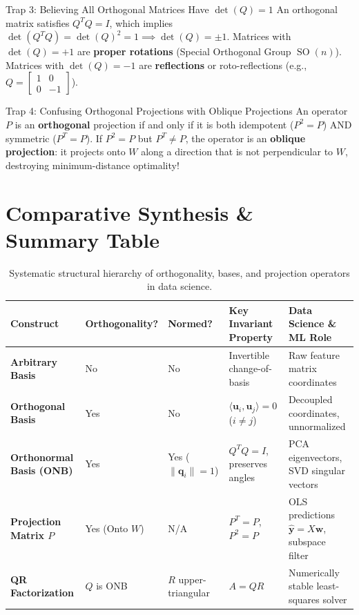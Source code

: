 \begin{trapbox}{Trap 3: Believing All Orthogonal Matrices Have $\det(Q) = 1$}
An orthogonal matrix satisfies $Q^T Q = I$, which implies $\det(Q^T Q) = \det(Q)^2 = 1 \implies \det(Q) = \pm 1$. Matrices with $\det(Q) = +1$ are \textbf{proper rotations} (Special Orthogonal Group $\operatorname{SO}(n)$). Matrices with $\det(Q) = -1$ are \textbf{reflections} or roto-reflections (e.g., $Q = \begin{bmatrix} 1 & 0 \\ 0 & -1 \end{bmatrix}$).
\end{trapbox}

\begin{trapbox}{Trap 4: Confusing Orthogonal Projections with Oblique Projections}
An operator $P$ is an \textbf{orthogonal} projection if and only if it is both idempotent ($P^2 = P$) AND symmetric ($P^T = P$). If $P^2 = P$ but $P^T \neq P$, the operator is an \textbf{oblique projection}: it projects onto $W$ along a direction that is not perpendicular to $W$, destroying minimum-distance optimality!
\end{trapbox}

\section{Comparative Synthesis \& Summary Table}

\begin{table}[htbp]
\centering
\small
\begin{tabular}{p{2.8cm} p{2.2cm} p{2.5cm} p{2.8cm} p{3.2cm}}
\toprule
\textbf{Construct} & \textbf{Orthogonality?} & \textbf{Normed?} & \textbf{Key Invariant Property} & \textbf{Data Science \& ML Role} \\
\midrule
\textbf{Arbitrary Basis} & No & No & Invertible change-of-basis & Raw feature matrix coordinates \\
\textbf{Orthogonal Basis} & Yes & No & $\langle \mathbf{u}_i, \mathbf{u}_j \rangle = 0$ ($i \neq j$) & Decoupled coordinates, unnormalized \\
\textbf{Orthonormal Basis (ONB)} & Yes & Yes ($\|\mathbf{q}_i\| = 1$) & $Q^T Q = I$, preserves angles & PCA eigenvectors, SVD singular vectors \\
\textbf{Projection Matrix $P$} & Yes (Onto $W$) & N/A & $P^T = P$, $P^2 = P$ & OLS predictions $\hat{\mathbf{y}} = X\mathbf{w}$, subspace filter \\
\textbf{QR Factorization} & $Q$ is ONB & $R$ upper-triangular & $A = QR$ & Numerically stable least-squares solver \\
\bottomrule
\end{tabular}
\caption{Systematic structural hierarchy of orthogonality, bases, and projection operators in data science.}
\label{tab:orthogonality_taxonomy}
\end{table}


